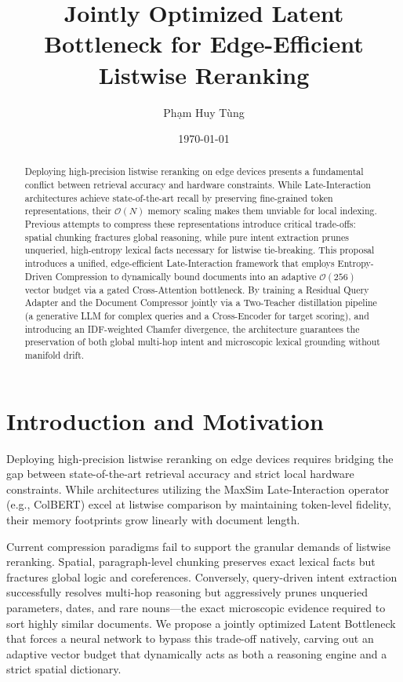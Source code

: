 \documentclass[11pt, a4paper]{article}
\title{\textbf{Jointly Optimized Latent Bottleneck for Edge-Efficient Listwise Reranking}}
\author{Phạm Huy Tùng}
\date{\today}
\begin{document}
\maketitle

\begin{abstract}
Deploying high-precision listwise reranking on edge devices presents a fundamental conflict between retrieval accuracy and hardware constraints. While Late-Interaction architectures achieve state-of-the-art recall by preserving fine-grained token representations, their $\mathcal{O}(N)$ memory scaling makes them unviable for local indexing. Previous attempts to compress these representations introduce critical trade-offs: spatial chunking fractures global reasoning, while pure intent extraction prunes unqueried, high-entropy lexical facts necessary for listwise tie-breaking. This proposal introduces a unified, edge-efficient Late-Interaction framework that employs Entropy-Driven Compression to dynamically bound documents into an adaptive $\mathcal{O}(256)$ vector budget via a gated Cross-Attention bottleneck. By training a Residual Query Adapter and the Document Compressor jointly via a Two-Teacher distillation pipeline (a generative LLM for complex queries and a Cross-Encoder for target scoring), and introducing an IDF-weighted Chamfer divergence, the architecture guarantees the preservation of both global multi-hop intent and microscopic lexical grounding without manifold drift.
\end{abstract}

\section{Introduction and Motivation}
Deploying high-precision listwise reranking on edge devices requires bridging the gap between state-of-the-art retrieval accuracy and strict local hardware constraints. While architectures utilizing the MaxSim Late-Interaction operator (e.g., ColBERT) excel at listwise comparison by maintaining token-level fidelity, their memory footprints grow linearly with document length. 

Current compression paradigms fail to support the granular demands of listwise reranking. Spatial, paragraph-level chunking preserves exact lexical facts but fractures global logic and coreferences. Conversely, query-driven intent extraction successfully resolves multi-hop reasoning but aggressively prunes unqueried parameters, dates, and rare nouns---the exact microscopic evidence required to sort highly similar documents. We propose a jointly optimized Latent Bottleneck that forces a neural network to bypass this trade-off natively, carving out an adaptive vector budget that dynamically acts as both a reasoning engine and a strict spatial dictionary.
\end{document}
